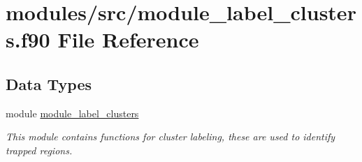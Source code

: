 \hypertarget{module__label__clusters_8f90}{
\section{modules/src/module\-\_\-label\-\_\-clusters.f90 \-File \-Reference}
\label{module__label__clusters_8f90}
}
\subsection*{\-Data \-Types}
\begin{DoxyCompactItemize}
\item 
module \hyperlink{classmodule__label__clusters}{module\-\_\-label\-\_\-clusters}
\begin{DoxyCompactList}\small\item\em \-This module contains functions for cluster labeling, these are used to identify trapped regions. \end{DoxyCompactList}\end{DoxyCompactItemize}
